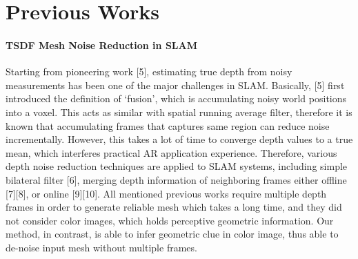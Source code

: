 \section{Previous Works}

\paragraph{TSDF Mesh Noise Reduction in SLAM}
Starting from pioneering work [5], 
estimating true depth from noisy measurements 
has been one of the major challenges in SLAM. 
Basically, [5] first introduced the definition of ‘fusion’, 
which is accumulating noisy world positions into a voxel. 
This acts as similar with spatial running average filter, 
therefore it is known that accumulating frames 
that captures same region can reduce noise incrementally. 
However, this takes a lot of time to converge depth values 
to a true mean, which interferes practical AR application experience. 
Therefore, various depth noise reduction techniques are applied to SLAM systems, 
including simple bilateral filter [6],  merging depth information of neighboring frames either offline [7][8], or online [9][10]. 
All mentioned previous works require multiple depth frames 
in order to generate reliable mesh which takes a long time, 
and they did not consider color images, which holds perceptive geometric information. 
Our method, in contrast, is able to infer geometric clue in color image, 
thus able to de-noise input mesh without multiple frames.

